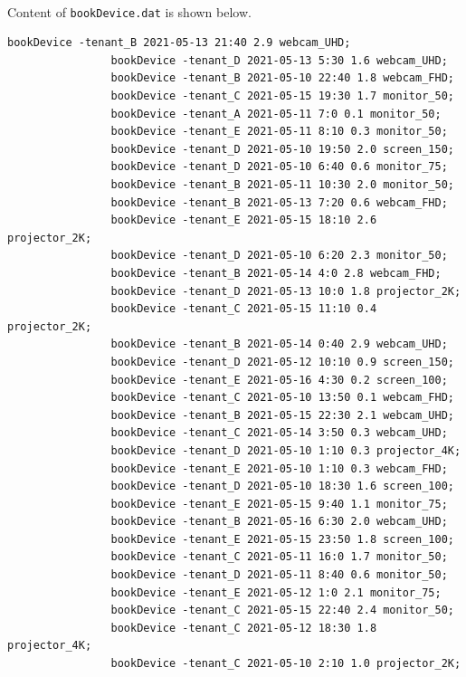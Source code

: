 \documentclass{article}
\begin{document}
            \paragraph{}
                Content of \texttt{bookDevice.dat} is shown below.
            \begin{Verbatim}[gobble=8]
                bookDevice -tenant_B 2021-05-13 21:40 2.9 webcam_UHD;
                bookDevice -tenant_D 2021-05-13 5:30 1.6 webcam_UHD;
                bookDevice -tenant_B 2021-05-10 22:40 1.8 webcam_FHD;
                bookDevice -tenant_C 2021-05-15 19:30 1.7 monitor_50;
                bookDevice -tenant_A 2021-05-11 7:0 0.1 monitor_50;
                bookDevice -tenant_E 2021-05-11 8:10 0.3 monitor_50;
                bookDevice -tenant_D 2021-05-10 19:50 2.0 screen_150;
                bookDevice -tenant_D 2021-05-10 6:40 0.6 monitor_75;
                bookDevice -tenant_B 2021-05-11 10:30 2.0 monitor_50;
                bookDevice -tenant_B 2021-05-13 7:20 0.6 webcam_FHD;
                bookDevice -tenant_E 2021-05-15 18:10 2.6 projector_2K;
                bookDevice -tenant_D 2021-05-10 6:20 2.3 monitor_50;
                bookDevice -tenant_B 2021-05-14 4:0 2.8 webcam_FHD;
                bookDevice -tenant_D 2021-05-13 10:0 1.8 projector_2K;
                bookDevice -tenant_C 2021-05-15 11:10 0.4 projector_2K;
                bookDevice -tenant_B 2021-05-14 0:40 2.9 webcam_UHD;
                bookDevice -tenant_D 2021-05-12 10:10 0.9 screen_150;
                bookDevice -tenant_E 2021-05-16 4:30 0.2 screen_100;
                bookDevice -tenant_C 2021-05-10 13:50 0.1 webcam_FHD;
                bookDevice -tenant_B 2021-05-15 22:30 2.1 webcam_UHD;
                bookDevice -tenant_C 2021-05-14 3:50 0.3 webcam_UHD;
                bookDevice -tenant_D 2021-05-10 1:10 0.3 projector_4K;
                bookDevice -tenant_E 2021-05-10 1:10 0.3 webcam_FHD;
                bookDevice -tenant_D 2021-05-10 18:30 1.6 screen_100;
                bookDevice -tenant_E 2021-05-15 9:40 1.1 monitor_75;
                bookDevice -tenant_B 2021-05-16 6:30 2.0 webcam_UHD;
                bookDevice -tenant_E 2021-05-15 23:50 1.8 screen_100;
                bookDevice -tenant_C 2021-05-11 16:0 1.7 monitor_50;
                bookDevice -tenant_D 2021-05-11 8:40 0.6 monitor_50;
                bookDevice -tenant_E 2021-05-12 1:0 2.1 monitor_75;
                bookDevice -tenant_C 2021-05-15 22:40 2.4 monitor_50;
                bookDevice -tenant_C 2021-05-12 18:30 1.8 projector_4K;
                bookDevice -tenant_C 2021-05-10 2:10 1.0 projector_2K;

\end{Verbatim}
\end{document}
